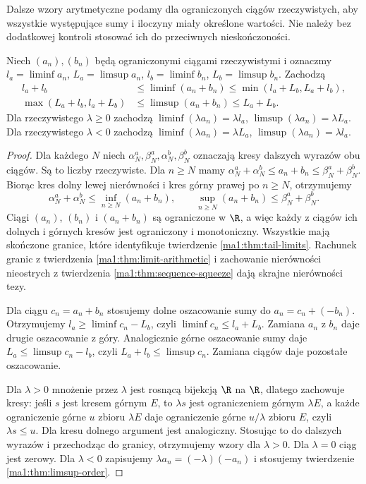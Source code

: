 Dalsze wzory arytmetyczne podamy dla ograniczonych ciągów rzeczywistych, aby wszystkie występujące sumy i iloczyny miały określone wartości. Nie należy bez dodatkowej kontroli stosować ich do przeciwnych nieskończoności.

\begin{twierdzenie}
\label{ma1:thm:limsup-arithmetic}
Niech $(a_n),(b_n)$ będą ograniczonymi ciągami rzeczywistymi i oznaczmy $l_a=\liminf a_n$, $L_a=\limsup a_n$, $l_b=\liminf b_n$, $L_b=\limsup b_n$. Zachodzą
\[
\begin{aligned}
 l_a+l_b&\le\liminf(a_n+b_n)
 \le\min(l_a+L_b,L_a+l_b),\\
 \max(L_a+l_b,l_a+L_b)&\le\limsup(a_n+b_n)
 \le L_a+L_b.
\end{aligned}
\]
Dla rzeczywistego $\lambda\ge0$ zachodzą $\liminf(\lambda a_n)=\lambda l_a$, $\limsup(\lambda a_n)=\lambda L_a$. Dla rzeczywistego $\lambda<0$ zachodzą $\liminf(\lambda a_n)=\lambda L_a$, $\limsup(\lambda a_n)=\lambda l_a$.
\end{twierdzenie}
\begin{proof}
Dla każdego $N$ niech $\alpha_N^a,\beta_N^a,\alpha_N^b,\beta_N^b$ oznaczają kresy dalszych wyrazów obu ciągów. Są to liczby rzeczywiste. Dla $n\ge N$ mamy
$\alpha_N^a+\alpha_N^b\le a_n+b_n\le\beta_N^a+\beta_N^b$.
Biorąc kres dolny lewej nierówności i kres górny prawej po $n\ge N$, otrzymujemy
\[
 \alpha_N^a+\alpha_N^b\le\inf_{n\ge N}(a_n+b_n),
 \qquad
 \sup_{n\ge N}(a_n+b_n)\le\beta_N^a+\beta_N^b.
\]
Ciągi $(a_n)$, $(b_n)$ i $(a_n+b_n)$ są ograniczone w $\R$, a więc każdy z ciągów ich dolnych i górnych kresów jest ograniczony i monotoniczny. Wszystkie mają skończone granice, które identyfikuje twierdzenie \ref{ma1:thm:tail-limits}. Rachunek granic z twierdzenia \ref{ma1:thm:limit-arithmetic} i zachowanie nierówności nieostrych z twierdzenia \ref{ma1:thm:sequence-squeeze} dają skrajne nierówności tezy.

Dla ciągu $c_n=a_n+b_n$ stosujemy dolne oszacowanie sumy do $a_n=c_n+(-b_n)$. Otrzymujemy $l_a\ge\liminf c_n-L_b$, czyli $\liminf c_n\le l_a+L_b$. Zamiana $a_n$ z $b_n$ daje drugie oszacowanie z góry. Analogicznie górne oszacowanie sumy daje $L_a\le\limsup c_n-l_b$, czyli $L_a+l_b\le\limsup c_n$. Zamiana ciągów daje pozostałe oszacowanie.

Dla $\lambda>0$ mnożenie przez $\lambda$ jest rosnącą bijekcją $\R$ na $\R$, dlatego zachowuje kresy: jeśli $s$ jest kresem górnym $E$, to $\lambda s$ jest ograniczeniem górnym $\lambda E$, a każde ograniczenie górne $u$ zbioru $\lambda E$ daje ograniczenie górne $u/\lambda$ zbioru $E$, czyli $\lambda s\le u$. Dla kresu dolnego argument jest analogiczny. Stosując to do dalszych wyrazów i przechodząc do granicy, otrzymujemy wzory dla $\lambda>0$. Dla $\lambda=0$ ciąg jest zerowy. Dla $\lambda<0$ zapisujemy $\lambda a_n=(-\lambda)(-a_n)$ i stosujemy twierdzenie \ref{ma1:thm:limsup-order}.
\end{proof}
